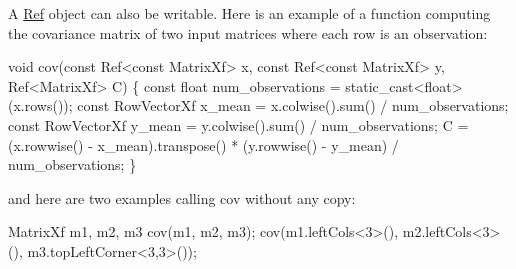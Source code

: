 A \hyperlink{group___core___module_class_eigen_1_1_ref}{Ref} object can also be writable. Here is an example of a function computing the covariance matrix of two input matrices where each row is an observation\+: 
\begin{DoxyCode}
\textcolor{keywordtype}{void} cov(\textcolor{keyword}{const} Ref<const MatrixXf> x, \textcolor{keyword}{const} Ref<const MatrixXf> y, Ref<MatrixXf> C)
\{
  \textcolor{keyword}{const} \textcolor{keywordtype}{float} num\_observations = \textcolor{keyword}{static\_cast<}\textcolor{keywordtype}{float}\textcolor{keyword}{>}(x.rows());
  \textcolor{keyword}{const} RowVectorXf x\_mean = x.colwise().sum() / num\_observations;
  \textcolor{keyword}{const} RowVectorXf y\_mean = y.colwise().sum() / num\_observations;
  C = (x.rowwise() - x\_mean).transpose() * (y.rowwise() - y\_mean) / num\_observations;
\}
\end{DoxyCode}
 and here are two examples calling cov without any copy\+: 
\begin{DoxyCode}
MatrixXf m1, m2, m3
cov(m1, m2, m3);
cov(m1.leftCols<3>(), m2.leftCols<3>(), m3.topLeftCorner<3,3>());
\end{DoxyCode}

